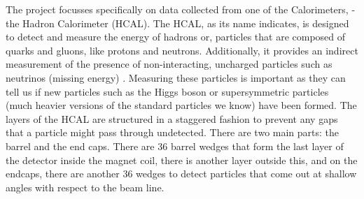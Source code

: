 The project focusses specifically on data collected from one of the Calorimeters, - the Hadron Calorimeter (HCAL). The HCAL, as its name indicates, is designed to detect and measure the energy of hadrons or, particles that are composed of quarks and gluons, like protons and neutrons. Additionally, it provides an indirect measurement of the presence of non-interacting, uncharged particles such as neutrinos (missing energy) . Measuring these particles is important as they can tell us if new particles such as the Higgs boson or supersymmetric particles (much heavier versions of the standard particles we know) have been formed. The layers of the HCAL are structured in a staggered fashion to prevent any gaps that a particle might pass through undetected. There are two main parts: the barrel and the end caps. There are 36 barrel wedges that form the last layer of the detector inside the magnet coil, there is another layer outside this, and on the endcaps, there are another 36 wedges to detect particles that come out at shallow angles with respect to the beam line.


